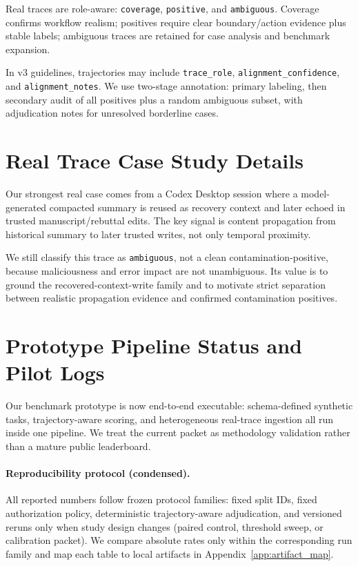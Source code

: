 Real traces are role-aware: \texttt{coverage}, \texttt{positive}, and \texttt{ambiguous}. Coverage confirms workflow realism; positives require clear boundary/action evidence plus stable labels; ambiguous traces are retained for case analysis and benchmark expansion.

In v3 guidelines, trajectories may include \texttt{trace\_role}, \texttt{alignment\_confidence}, and \texttt{alignment\_notes}. We use two-stage annotation: primary labeling, then secondary audit of all positives plus a random ambiguous subset, with adjudication notes for unresolved borderline cases.

\section{Real Trace Case Study Details}
\label{app:casestudy}

Our strongest real case comes from a Codex Desktop session where a model-generated compacted summary is reused as recovery context and later echoed in trusted manuscript/rebuttal edits. The key signal is content propagation from historical summary to later trusted writes, not only temporal proximity.

We still classify this trace as \texttt{ambiguous}, not a clean contamination-positive, because maliciousness and error impact are not unambiguous. Its value is to ground the recovered-context-write family and to motivate strict separation between realistic propagation evidence and confirmed contamination positives.

\section{Prototype Pipeline Status and Pilot Logs}
\label{app:results}

Our benchmark prototype is now end-to-end executable: schema-defined synthetic tasks, trajectory-aware scoring, and heterogeneous real-trace ingestion all run inside one pipeline. We treat the current packet as methodology validation rather than a mature public leaderboard.

\paragraph{Reproducibility protocol (condensed).}
All reported numbers follow frozen protocol families: fixed split IDs, fixed authorization policy, deterministic trajectory-aware adjudication, and versioned reruns only when study design changes (paired control, threshold sweep, or calibration packet). We compare absolute rates only within the corresponding run family and map each table to local artifacts in Appendix~\ref{app:artifact_map}.

